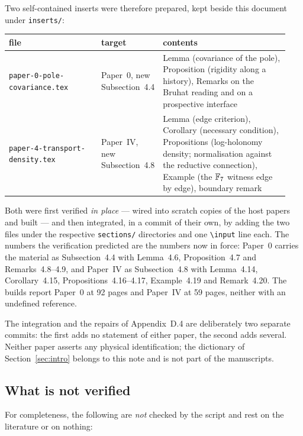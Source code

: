 Two self-contained inserts were therefore prepared, kept beside this document
under \texttt{inserts/}:

\begin{center}\small
\renewcommand{\arraystretch}{1.2}
\begin{tabular}{@{}p{0.345\linewidth}p{0.115\linewidth}p{0.48\linewidth}@{}}
\toprule
file & target & contents \\
\midrule
\texttt{paper-0-pole-covariance.tex} & Paper~0, new
Subsection~4.4 & Lemma (covariance of the pole), Proposition (rigidity along a
history), Remarks on the Bruhat reading and on a prospective interface \\
\texttt{paper-4-transport-density.tex} & Paper~IV, new
Subsection~4.8 & Lemma (edge criterion), Corollary (necessary condition),
Propositions (log-holonomy density; normalisation against the reductive
connection), Example (the $\mathbb{F}_7$ witness edge by edge), boundary remark \\
\bottomrule
\end{tabular}
\end{center}

Both were first verified \emph{in place} --- wired into scratch copies of the
host papers and built --- and then integrated, in a commit of their own, by
adding the two files under the respective \texttt{sections/} directories and one
\texttt{\textbackslash input} line each.  The numbers the verification predicted
are the numbers now in force: Paper~0 carries the material as
Subsection~4.4 with Lemma~4.6, Proposition~4.7 and Remarks~4.8--4.9, and
Paper~IV as Subsection~4.8 with Lemma~4.14, Corollary~4.15,
Propositions~4.16--4.17, Example~4.19 and Remark~4.20.  The builds report Paper~0
at 92 pages and Paper~IV at 59 pages, neither with an undefined reference.

The integration and the repairs of Appendix~D.4 are deliberately two separate
commits: the first adds no statement of either paper, the second adds several.
Neither paper asserts any physical identification; the dictionary of
Section~\ref{sec:intro} belongs to this note and is not part of the
manuscripts.

\subsection{What is not verified}

For completeness, the following are \emph{not} checked by the script and rest on
the literature or on nothing:

